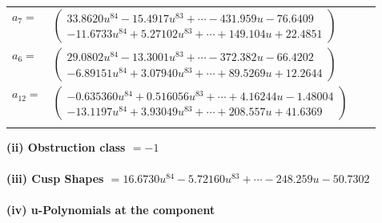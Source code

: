 \documentclass[1p]{elsarticle_modified}
\theoremstyle{definition}
\begin{document}
\begin{tabular}{m{7pt} m{180pt} m{7pt} m{180pt} }
\flushright $a_{7}=$&$\begin{pmatrix}33.8620 u^{84}-15.4917 u^{83}+\cdots-431.959 u-76.6409\\-11.6733 u^{84}+5.27102 u^{83}+\cdots+149.104 u+22.4851\end{pmatrix}$ \\
\flushright $a_{6}=$&$\begin{pmatrix}29.0802 u^{84}-13.3001 u^{83}+\cdots-372.382 u-66.4202\\-6.89151 u^{84}+3.07940 u^{83}+\cdots+89.5269 u+12.2644\end{pmatrix}$ \\
\flushright $a_{12}=$&$\begin{pmatrix}-0.635360 u^{84}+0.516056 u^{83}+\cdots+4.16244 u-1.48004\\-13.1197 u^{84}+3.93049 u^{83}+\cdots+208.557 u+41.6369\end{pmatrix}$\\&\end{tabular}
\flushleft \textbf{(ii) Obstruction class $= -1$}\\~\\
\flushleft \textbf{(iii) Cusp Shapes $= 16.6730 u^{84}-5.72160 u^{83}+\cdots-248.259 u-50.7302$}\\~\\
\newpage\renewcommand{\arraystretch}{1}
\flushleft \textbf{(iv) u-Polynomials at the component}\newline \\
\end{document}

